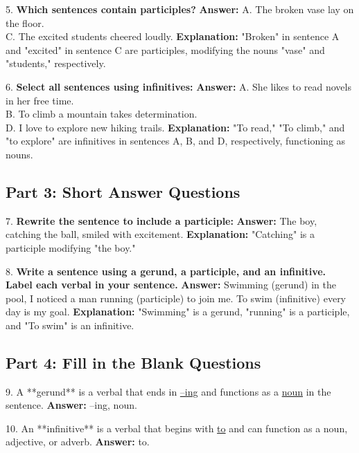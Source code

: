 \documentclass[12pt]{article}
\begin{document}
\vspace{1cm}
5. \textbf{Which sentences contain participles?}  
\textbf{Answer:} A. The broken vase lay on the floor. \\
C. The excited students cheered loudly.  
\textbf{Explanation:} "Broken" in sentence A and "excited" in sentence C are participles, modifying the nouns "vase" and "students," respectively.

\vspace{1cm}
6. \textbf{Select all sentences using infinitives:}  
\textbf{Answer:} A. She likes to read novels in her free time. \\
B. To climb a mountain takes determination. \\
D. I love to explore new hiking trails.  
\textbf{Explanation:} "To read," "To climb," and "to explore" are infinitives in sentences A, B, and D, respectively, functioning as nouns.

\subsection*{Part 3: Short Answer Questions}

7. \textbf{Rewrite the sentence to include a participle:}  
\textbf{Answer:} The boy, catching the ball, smiled with excitement.  
\textbf{Explanation:} "Catching" is a participle modifying "the boy."

\vspace{1cm}
8. \textbf{Write a sentence using a gerund, a participle, and an infinitive. Label each verbal in your sentence.}  
\textbf{Answer:} Swimming (gerund) in the pool, I noticed a man running (participle) to join me. To swim (infinitive) every day is my goal.  
\textbf{Explanation:} "Swimming" is a gerund, "running" is a participle, and "To swim" is an infinitive.

\subsection*{Part 4: Fill in the Blank Questions}

9. A **gerund** is a verbal that ends in \underline{–ing} and functions as a \underline{noun} in the sentence.  
\textbf{Answer:} –ing, noun.

10. An **infinitive** is a verbal that begins with \underline{to} and can function as a noun, adjective, or adverb.  
\textbf{Answer:} to.
\end{document}
